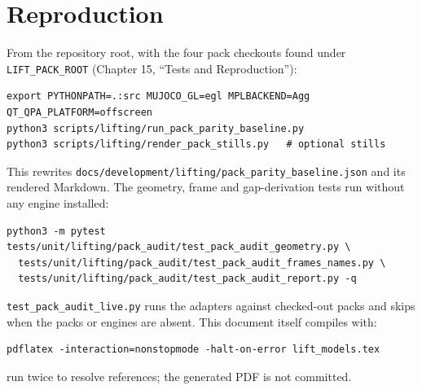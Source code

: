 \documentclass[11pt,a4paper]{article}
\begin{document}
\section{Reproduction}
From the repository root, with the four pack checkouts found under
\texttt{LIFT\_PACK\_ROOT} (Chapter 15, ``Tests and Reproduction''):
\begin{verbatim}
export PYTHONPATH=.:src MUJOCO_GL=egl MPLBACKEND=Agg QT_QPA_PLATFORM=offscreen
python3 scripts/lifting/run_pack_parity_baseline.py
python3 scripts/lifting/render_pack_stills.py   # optional stills
\end{verbatim}
This rewrites \texttt{docs/development/lifting/pack\_parity\_baseline.json}
and its rendered Markdown. The geometry, frame and gap-derivation tests run
without any engine installed:
\begin{verbatim}
python3 -m pytest tests/unit/lifting/pack_audit/test_pack_audit_geometry.py \
  tests/unit/lifting/pack_audit/test_pack_audit_frames_names.py \
  tests/unit/lifting/pack_audit/test_pack_audit_report.py -q
\end{verbatim}
\texttt{test\_pack\_audit\_live.py} runs the adapters against checked-out
packs and skips when the packs or engines are absent. This document itself
compiles with:
\begin{verbatim}
pdflatex -interaction=nonstopmode -halt-on-error lift_models.tex
\end{verbatim}
run twice to resolve references; the generated PDF is not committed.
\end{document}
